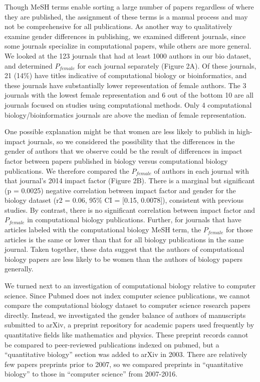 \documentclass[10pt,letterpaper]{article}
\begin{document}
\begin{flushleft}
Though MeSH terms enable sorting a large number of papers regardless of where they are published, the assignment of these terms is a manual process and may not be comprehensive for all publications. As another way to qualitatively examine gender differences in publishing, we examined different journals, since some journals specialize in computational papers, while others are more general. We looked at the 123  journals that had at least 1000 authors in our bio dataset, and determined $P_{female}$ for each journal separately (Figure 2A). Of these journals, 21 (14\%) have titles indicative of computational biology or bioinformatics, and these journals have substantially lower representation of female authors. The 3 journals with the lowest female representation and 6 out of the bottom 10 are all journals focused on studies using computational methods. Only 4 computational biology/bioinformatics journals are above the median of female representation.

One possible explanation might be that women are less likely to publish in high-impact journals, so we considered the possibility that the differences in the gender of authors that we observe could be the result of differences in impact factor between papers published in biology versus computational biology publications. We therefore compared the $P_{female}$ of authors in each journal with that journal’s 2014 impact factor (Figure 2B). There is a marginal but significant (p = 0.0025) negative correlation between impact factor and gender for the biology dataset (r2 = 0.06, 95\% CI = [0.15, 0.0078]), consistent with previous studies. By contrast, there is no significant correlation between impact factor and $P_{female}$ in computational biology publications. Further, for journals that have articles labeled with the computational biology MeSH term, the $P_{female}$ for those articles is the same or lower than that for all biology publications in the same journal. Taken together, these data suggest that the authors of computational biology papers are less likely to be women than the authors of biology papers generally.

We turned next to an investigation of computational biology relative to computer science. Since Pubmed does not index computer science publications, we cannot compare the computational biology dataset to computer science research papers directly. Instead, we investigated the gender balance of authors of manuscripts submitted to arXiv, a preprint repository for academic papers used frequently by quantitative fields like mathematics and physics. These preprint records cannot be compared to peer-reviewed publications indexed on pubmed, but a “quantitative biology” section was added to arXiv in 2003. There are relatively few papers preprints prior to 2007, so we compared preprints in “quantitative biology” to those in “computer science” from 2007-2016.


\end{flushleft}
\end{document}

